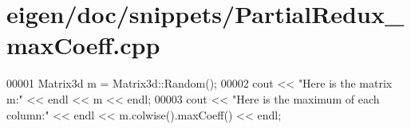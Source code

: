 \hypertarget{eigen_2doc_2snippets_2_partial_redux__max_coeff_8cpp_source}{}\section{eigen/doc/snippets/\+Partial\+Redux\+\_\+max\+Coeff.cpp}
\label{eigen_2doc_2snippets_2_partial_redux__max_coeff_8cpp_source}

\begin{DoxyCode}
00001 Matrix3d m = Matrix3d::Random();
00002 cout << \textcolor{stringliteral}{"Here is the matrix m:"} << endl << m << endl;
00003 cout << \textcolor{stringliteral}{"Here is the maximum of each column:"} << endl << m.colwise().maxCoeff() << endl;
\end{DoxyCode}
